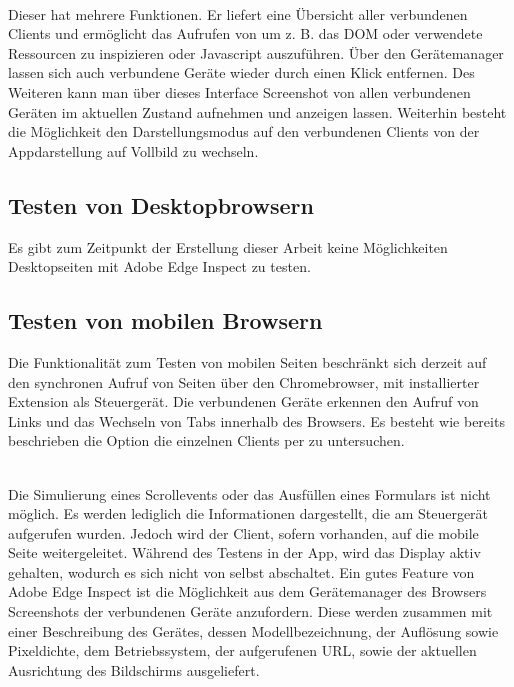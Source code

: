 		\\Dieser hat mehrere Funktionen. Er liefert eine Übersicht aller verbundenen Clients und ermöglicht das Aufrufen von  um z. B. das DOM oder verwendete Ressourcen zu inspizieren oder Javascript auszuführen. Über den Gerätemanager lassen sich auch verbundene Geräte wieder durch einen Klick entfernen. Des Weiteren kann man über dieses Interface Screenshot von allen verbundenen Geräten im aktuellen Zustand aufnehmen und anzeigen lassen. Weiterhin besteht die Möglichkeit den Darstellungsmodus auf den verbundenen Clients von der Appdarstellung auf Vollbild zu wechseln.
		
		\subsection{Testen von Desktopbrowsern}
		Es gibt zum Zeitpunkt der Erstellung dieser Arbeit keine Möglichkeiten Desktopseiten mit Adobe Edge Inspect zu testen.
		
		\subsection{Testen von mobilen Browsern}
		Die Funktionalität zum Testen von mobilen Seiten beschränkt sich derzeit auf den synchronen Aufruf von Seiten über den Chromebrowser, mit installierter Extension als Steuergerät. Die verbundenen Geräte erkennen den Aufruf von Links und das Wechseln von Tabs innerhalb des Browsers. Es besteht wie bereits beschrieben die Option die einzelnen Clients per  zu untersuchen.
		
		\\Die Simulierung eines Scrollevents oder das Ausfüllen eines Formulars ist nicht möglich. Es werden lediglich die Informationen dargestellt, die am Steuergerät aufgerufen wurden. Jedoch wird der Client, sofern vorhanden, auf die mobile Seite weitergeleitet. Während des Testens in der App, wird das Display aktiv gehalten, wodurch es sich nicht von selbst abschaltet. Ein gutes Feature von Adobe Edge Inspect ist die Möglichkeit aus dem Gerätemanager des Browsers Screenshots der verbundenen Geräte anzufordern. Diese werden zusammen mit einer Beschreibung des Gerätes, dessen Modellbezeichnung, der Auflösung sowie Pixeldichte, dem Betriebssystem, der aufgerufenen URL, sowie der aktuellen Ausrichtung des Bildschirms ausgeliefert.
		
